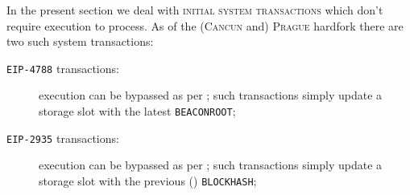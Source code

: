 In the present section we deal with \textsc{initial system transactions} which don't require \evm{} execution to process.
As of the (\textsc{Cancun} and) \textsc{Prague} hardfork there are two such system transactions:
\begin{description}
	\item[\texttt{EIP-4788} transactions:]
		\evm{} execution can be bypassed as per \cite{EIP-4788};
		such transactions simply update a storage slot with the latest \texttt{BEACONROOT};
	\item[\texttt{EIP-2935} transactions:]
		\evm{} execution can be bypassed as per \cite{EIP-2935};
		such transactions simply update a storage slot with the previous (\linea) \texttt{BLOCKHASH};
\end{description}
